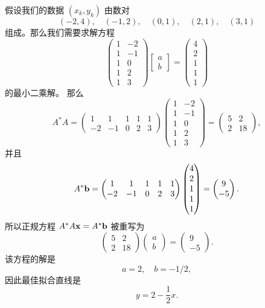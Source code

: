 假设我们的数据 $(x_k, y_k)$ 由数对 $$(-2, 4), \quad (-1, 2), \quad (0, 1), \quad (2, 1), \quad (3, 1)$$
组成。那么我们需要求解方程
$$\begin{pmatrix} 1 & -2 \\ 1 & -1 \\ 1 & 0 \\ 1 & 2 \\ 1 & 3 \end{pmatrix} \begin{bmatrix} a \\ b \end{bmatrix} = \begin{pmatrix} 4 \\ 2 \\ 1 \\ 1 \\ 1 \end{pmatrix}$$
的最小二乘解。
那么 $$A^*A = \begin{pmatrix} 1 & 1 & 1 & 1 & 1 \\ -2 & -1 & 0 & 2 & 3 \end{pmatrix} \begin{pmatrix} 1 & -2 \\ 1 & -1 \\ 1 & 0 \\ 1 & 2 \\ 1 & 3 \end{pmatrix} = \begin{pmatrix} 5 & 2 \\ 2 & 18 \end{pmatrix},$$
并且
$$A^*\mathbf{b} = \begin{pmatrix} 1 & 1 & 1 & 1 & 1 \\ -2 & -1 & 0 & 2 & 3 \end{pmatrix} \begin{pmatrix} 4 \\ 2 \\ 1 \\ 1 \\ 1 \end{pmatrix} = \begin{pmatrix} 9 \\ -5 \end{pmatrix}.$$
所以正规方程 $A^*A\mathbf{x} = A^*\mathbf{b}$ 被重写为
$$\begin{pmatrix} 5 & 2 \\ 2 & 18 \end{pmatrix} \begin{pmatrix} a \\ b \end{pmatrix} = \begin{pmatrix} 9 \\ -5 \end{pmatrix}.$$
该方程的解是
$$a = 2, \quad b = -1/2,$$
因此最佳拟合直线是
$$y = 2 - \frac{1}{2}x.$$

